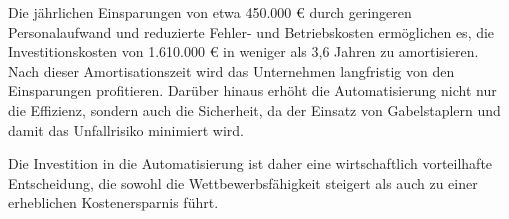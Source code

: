 Die jährlichen Einsparungen von etwa 450.000 € durch geringeren Personalaufwand und reduzierte Fehler- und Betriebskosten ermöglichen es, die Investitionskosten von 1.610.000 € in weniger als 3,6 Jahren zu amortisieren. Nach dieser Amortisationszeit wird das Unternehmen langfristig von den Einsparungen profitieren. Darüber hinaus erhöht die Automatisierung nicht nur die Effizienz, sondern auch die Sicherheit, da der Einsatz von Gabelstaplern und damit das Unfallrisiko minimiert wird.

Die Investition in die Automatisierung ist daher eine wirtschaftlich vorteilhafte Entscheidung, die sowohl die Wettbewerbsfähigkeit steigert als auch zu einer erheblichen Kostenersparnis führt.




